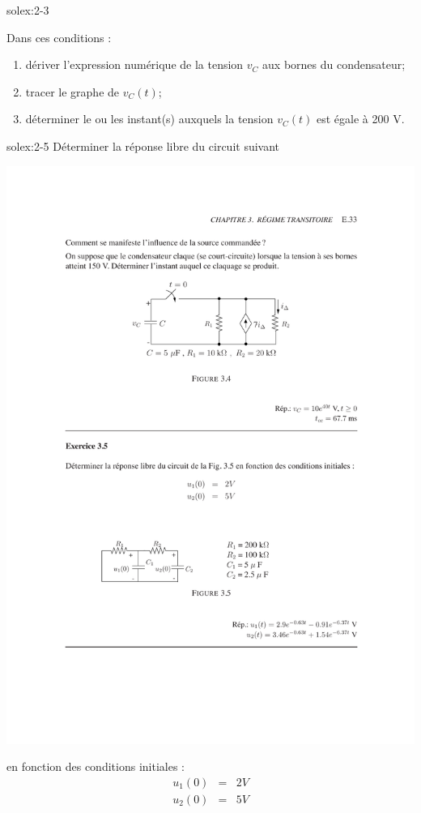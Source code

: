 \begin{exwithsol}{}{solex:2-3}
\begin{enumerate}
\end{enumerate}
Dans ces conditions :
\begin{enumerate}
	\item d\'eriver l'expression num\'erique de la tension $v_C$ aux bornes du condensateur;
	\item tracer le graphe de $v_C(t)$;
	\item d\'eterminer le ou les instant(s) auxquels la tension $v_C(t)$ est \'egale \`a 200 V.
\end{enumerate}
\end{exwithsol}

\begin{exwithsol}{}{solex:2-5}
	\label{ex:2-5}
D\'eterminer la r\'eponse libre du circuit suivant
\begin{center}
	\includegraphics[width=0.8\linewidth]{exercices/ex-3-5}
\end{center}
en fonction des conditions initiales :
\begin{eqnarray*}
	u_1(0)&=&2V\\
	u_2(0)&=&5V\\
\end{eqnarray*}


\end{exwithsol}

